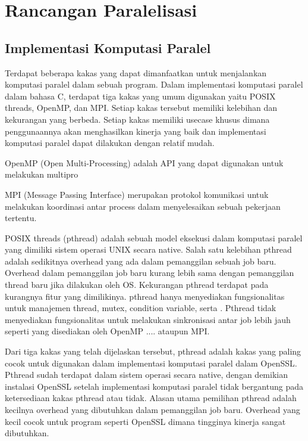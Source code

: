 \section{Rancangan Paralelisasi}
\subsection{Implementasi Komputasi Paralel} \label{sec:parallel_env}

Terdapat beberapa kakas yang dapat dimanfaatkan untuk menjalankan komputasi paralel dalam sebuah program.
Dalam implementasi komputasi paralel dalam bahasa C, terdapat tiga kakas yang umum digunakan yaitu POSIX threads, OpenMP, dan MPI. Setiap kakas tersebut memiliki kelebihan dan kekurangan yang berbeda. Setiap kakas memiliki usecase khusus dimana penggunaannya akan menghasilkan kinerja yang baik dan implementasi komputasi paralel dapat dilakukan dengan relatif mudah.



OpenMP (Open Multi-Processing) adalah API yang dapat digunakan untuk melakukan multipro

MPI (Message Passing Interface) merupakan protokol komunikasi untuk melakukan koordinasi antar process dalam menyelesaikan sebuah pekerjaan tertentu.

POSIX threads (pthread) adalah sebuah model eksekusi dalam komputasi paralel yang dimiliki sistem operasi UNIX secara native. Salah satu kelebihan pthread adalah sedikitnya overhead yang ada dalam pemanggilan sebuah job baru. Overhead dalam pemanggilan job baru kurang lebih sama dengan pemanggilan thread baru jika dilakukan oleh OS. Kekurangan pthread terdapat pada kurangnya fitur yang dimilikinya. pthread hanya menyediakan fungsionalitas untuk manajemen thread, mutex, condition variable, serta . Pthread tidak menyediakan fungsionalitas untuk melakukan sinkronisasi antar job lebih jauh seperti yang disediakan oleh OpenMP .... ataupun MPI.

Dari tiga kakas yang telah dijelaskan tersebut, pthread adalah kakas yang paling cocok untuk digunakan dalam implementasi komputasi paralel dalam OpenSSL. Pthread sudah terdapat dalam sistem operasi secara native, dengan demikian instalasi OpenSSL setelah implementasi komputasi paralel tidak bergantung pada ketersediaan kakas pthread atau tidak. Alasan utama pemilihan pthread adalah kecilnya overhead yang dibutuhkan dalam pemanggilan job baru. Overhead yang kecil cocok untuk program seperti OpenSSL dimana tingginya kinerja sangat dibutuhkan.

